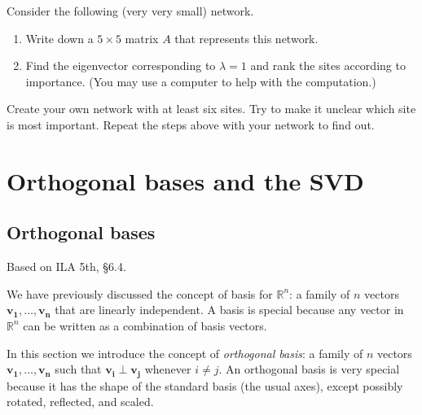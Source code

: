 \documentclass[11pt,oneside]{amsbook}
\newcommand{\R}{\mathbb R}
\theoremstyle{definition}
\theoremstyle{plain}
\theoremstyle{definition}
\theoremstyle{remark}
\numberwithin{equation}{section}
\numberwithin{figure}{section}
\newcounter{activityitem}
\newenvironment{activity}{\begin{list}{\arabic{activityitem}.}{\usecounter{activityitem}\setlength{\itemsep}{.2in}}}{\end{list}}
\begin{document}
\begin{activity}
  \item Consider the following (very very small) network.
  \begin{center}
  \end{center}
  \begin{enumerate}
    \item Write down a $5\times5$ matrix $A$ that represents this network.
    \item Find the eigenvector corresponding to $\lambda=1$ and rank the sites according to importance. (You may use a computer to help with the computation.)
  \end{enumerate}
  \item Create your own network with at least six sites. Try to make it unclear which site is most important. Repeat the steps above with your network to find out.
\end{activity}


\chapter{Orthogonal bases and the SVD}

\section{Orthogonal bases}

Based on ILA 5th, \S 6.4.

We have previously discussed the concept of basis for $\R^n$: a family of $n$ vectors $\mathbf{v_1},\ldots,\mathbf{v_n}$ that are linearly independent. A basis is special because any vector in $\R^n$ can be written as a combination of basis vectors.

In this section we introduce the concept of \emph{orthogonal basis}: a family of $n$ vectors $\mathbf{v_1},\ldots,\mathbf{v_n}$ such that $\mathbf{v_i}\perp\mathbf{v_j}$ whenever $i\neq j$. An orthogonal basis is very special because it has the shape of the standard basis (the usual axes), except possibly rotated, reflected, and scaled.
\end{document}
